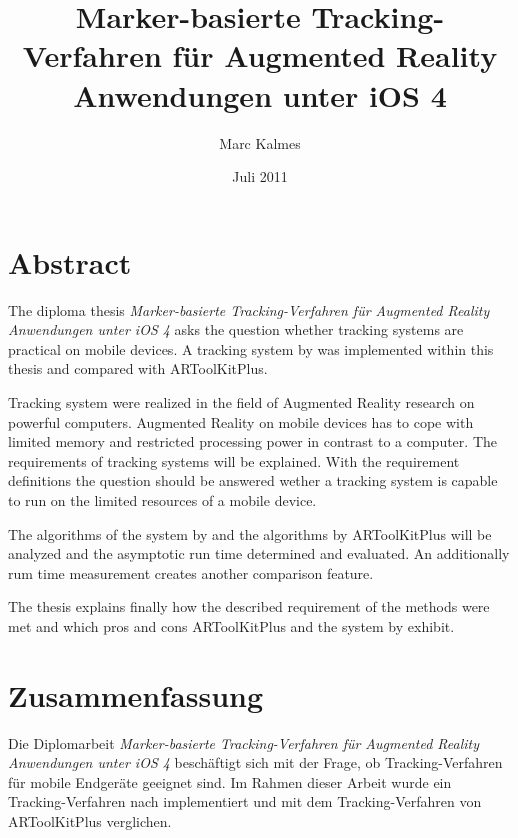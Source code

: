%
%




\frontmatter

\ifpdf
{}
\else
{}
\fi

\titlehead{Fachhochschule Köln\\ Fakultät für Informatik und Ingenieurwissenschaften}
\subject{Diplomarbeit}
\title{Marker-basierte Tracking-Verfahren für Augmented Reality Anwendungen unter iOS 4}
\author{Marc Kalmes}
\date{Juli 2011}
\publishers{betreut durch Prof. Dr. Heiner Klocke}

\maketitle

\chapter*{Abstract} %
\label{cha:abstract}
The diploma thesis \emph{Marker-basierte Tracking-Verfahren für Augmented Reality Anwendungen unter iOS 4} asks the question whether tracking systems are practical on mobile devices. A tracking system by \citeauthor{hirzer08} was implemented within this thesis and compared with ARToolKitPlus.

Tracking system were realized in the field of Augmented Reality research on powerful computers. Augmented Reality on mobile devices has to cope with limited memory and restricted processing power in contrast to a computer. The requirements of tracking systems will be explained. With the requirement definitions the question should be answered wether a tracking system is capable to run on the limited resources of a mobile device.

The algorithms of the system by \citeauthor{hirzer08} and the algorithms by ARToolKitPlus will be analyzed and the asymptotic run time determined and evaluated. An additionally rum time measurement creates another comparison feature.

The thesis explains finally how the described requirement of the methods were met and which pros and cons ARToolKitPlus and the system by \citeauthor{hirzer08} exhibit.
\chapter*{Zusammenfassung} %
\label{cha:abstract-deu}
Die Diplomarbeit \emph{Marker-basierte Tracking-Verfahren für Augmented Reality Anwendungen unter iOS 4} beschäftigt
 sich mit der Frage, ob Tracking-Verfahren für mobile Endgeräte geeignet sind. Im Rahmen dieser Arbeit wurde ein
 Tracking-Verfahren nach \citeauthor{hirzer08} implementiert und mit dem Tracking-Verfahren von ARToolKitPlus
 verglichen.

